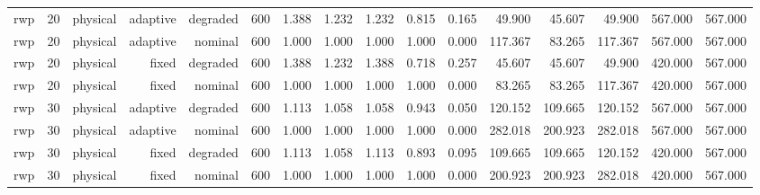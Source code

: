 \begin{tabular}{lrrrrrrrrrrrrrrr}
rwp & 20 & physical & adaptive & degraded & 600 & 1.388 & 1.232 & 1.232 & 0.815 & 0.165 & 49.900 & 45.607 & 49.900 & 567.000 & 567.000 \\
rwp & 20 & physical & adaptive & nominal & 600 & 1.000 & 1.000 & 1.000 & 1.000 & 0.000 & 117.367 & 83.265 & 117.367 & 567.000 & 567.000 \\
rwp & 20 & physical & fixed & degraded & 600 & 1.388 & 1.232 & 1.388 & 0.718 & 0.257 & 45.607 & 45.607 & 49.900 & 420.000 & 567.000 \\
rwp & 20 & physical & fixed & nominal & 600 & 1.000 & 1.000 & 1.000 & 1.000 & 0.000 & 83.265 & 83.265 & 117.367 & 420.000 & 567.000 \\
rwp & 30 & physical & adaptive & degraded & 600 & 1.113 & 1.058 & 1.058 & 0.943 & 0.050 & 120.152 & 109.665 & 120.152 & 567.000 & 567.000 \\
rwp & 30 & physical & adaptive & nominal & 600 & 1.000 & 1.000 & 1.000 & 1.000 & 0.000 & 282.018 & 200.923 & 282.018 & 567.000 & 567.000 \\
rwp & 30 & physical & fixed & degraded & 600 & 1.113 & 1.058 & 1.113 & 0.893 & 0.095 & 109.665 & 109.665 & 120.152 & 420.000 & 567.000 \\
rwp & 30 & physical & fixed & nominal & 600 & 1.000 & 1.000 & 1.000 & 1.000 & 0.000 & 200.923 & 200.923 & 282.018 & 420.000 & 567.000 \\
\bottomrule
\end{tabular}